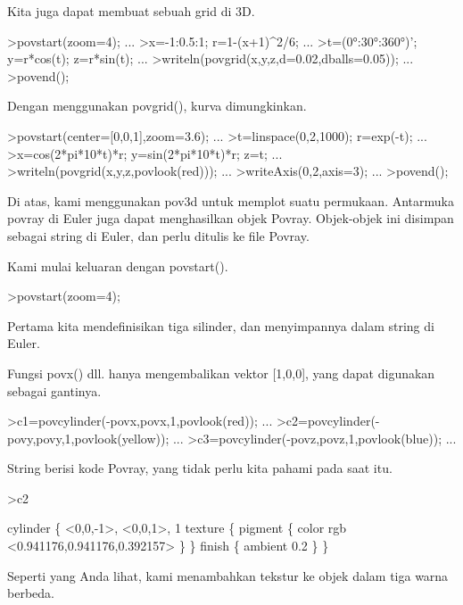 \documentclass[a4paper,10pt]{article}
\begin{document}
\begin{eulernotebook}
\begin{eulercomment}
\begin{eulercomment}
\begin{eulercomment}
Kita juga dapat membuat sebuah grid di 3D.
\end{eulercomment}
\begin{eulerprompt}
>povstart(zoom=4); ...
>x=-1:0.5:1; r=1-(x+1)^2/6; ...
>t=(0°:30°:360°)'; y=r*cos(t); z=r*sin(t); ...
>writeln(povgrid(x,y,z,d=0.02,dballs=0.05)); ...
>povend();
\end{eulerprompt}
\begin{eulercomment}
Dengan menggunakan povgrid(), kurva dimungkinkan.
\end{eulercomment}
\begin{eulerprompt}
>povstart(center=[0,0,1],zoom=3.6); ...
>t=linspace(0,2,1000); r=exp(-t); ...
>x=cos(2*pi*10*t)*r; y=sin(2*pi*10*t)*r; z=t; ...
>writeln(povgrid(x,y,z,povlook(red))); ...
>writeAxis(0,2,axis=3); ...
>povend();
\end{eulerprompt}
\begin{eulercomment}
Di atas, kami menggunakan pov3d untuk memplot suatu permukaan.
Antarmuka povray di Euler juga dapat menghasilkan objek Povray.
Objek-objek ini disimpan sebagai string di Euler, dan perlu ditulis ke
file Povray.

Kami mulai keluaran dengan povstart().
\end{eulercomment}
\begin{eulerprompt}
>povstart(zoom=4);
\end{eulerprompt}
\begin{eulercomment}
Pertama kita mendefinisikan tiga silinder, dan menyimpannya dalam
string di Euler.

Fungsi povx() dll. hanya mengembalikan vektor [1,0,0], yang dapat
digunakan sebagai gantinya.
\end{eulercomment}
\begin{eulerprompt}
>c1=povcylinder(-povx,povx,1,povlook(red)); ...
>c2=povcylinder(-povy,povy,1,povlook(yellow)); ...
>c3=povcylinder(-povz,povz,1,povlook(blue)); ...
\end{eulerprompt}
\begin{eulercomment}
String berisi kode Povray, yang tidak perlu kita pahami pada saat itu.
\end{eulercomment}
\begin{eulerprompt}
>c2
\end{eulerprompt}
\begin{euleroutput}
  cylinder \{ <0,0,-1>, <0,0,1>, 1
   texture \{ pigment \{ color rgb <0.941176,0.941176,0.392157> \}  \} 
   finish \{ ambient 0.2 \} 
   \}
\end{euleroutput}
\begin{eulercomment}
Seperti yang Anda lihat, kami menambahkan tekstur ke objek dalam tiga
warna berbeda.


\end{eulercomment}
\end{eulercomment}
\end{eulercomment}
\end{eulernotebook}
\end{document}
